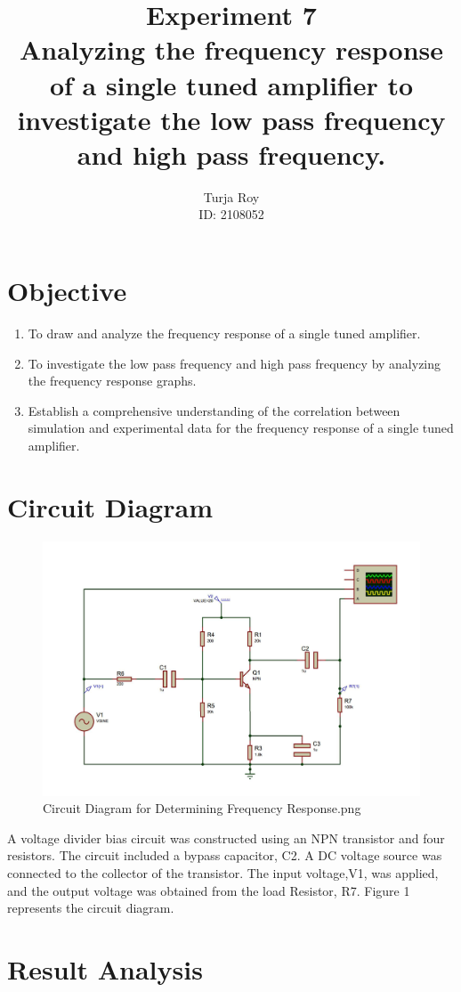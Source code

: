 \documentclass[12pt]{article}
\title{
    \textbf{Experiment 7} \\
    \textbf{\Large Analyzing the frequency response of a single tuned amplifier to investigate the low pass frequency and high pass frequency.}
}
\author{
    Turja Roy \\
    ID: 2108052
}
\date{}
\begin{document}
\maketitle

\section{Objective}

\begin{enumerate}
    \item To draw and analyze the frequency response of a single tuned amplifier.
    \item To investigate the low pass frequency and high pass frequency by analyzing the frequency response graphs. 
    \item Establish a comprehensive understanding of the correlation between simulation and experimental data for the frequency response of a single tuned amplifier.
\end{enumerate}

\section{Circuit Diagram}

\begin{figure}[h!]
    \centering
    \includegraphics[width=.7\textwidth]{Circuit.png}
    \caption{Circuit Diagram for Determining Frequency Response.png}
\end{figure}

A voltage divider bias circuit was constructed using an NPN transistor and four resistors. The circuit included a bypass capacitor, C2. A DC voltage source was connected to the collector of the transistor. The input voltage,V1, was applied, and the output voltage was obtained from the load Resistor, R7. Figure 1 represents the circuit diagram.

\section{Result Analysis}
\end{document}
